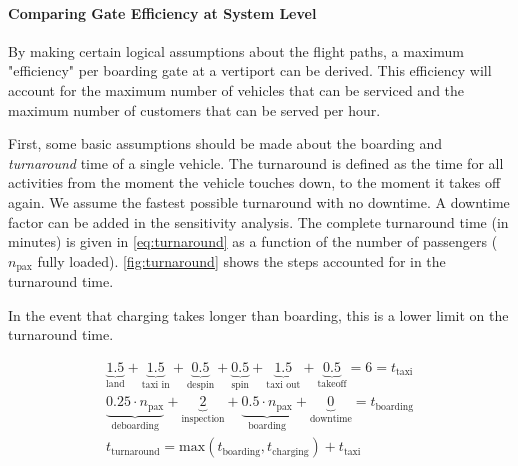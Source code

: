 \paragraph{Comparing Gate Efficiency at System Level}
By making certain logical assumptions about the flight paths, a maximum "efficiency" per boarding gate at a vertiport can be derived. This efficiency will account for the maximum number of vehicles that can be serviced and the maximum number of customers that can be served per hour.

First, some basic assumptions should be made about the boarding and \textit{turnaround} time of a single vehicle. The turnaround is defined as the time for all activities  from the moment the vehicle touches down, to the moment it takes off again. We assume the fastest possible turnaround with no downtime. A downtime factor can be added in the sensitivity analysis. The complete turnaround time (in minutes) is given in \autoref{eq:turnaround} as a function of the number of passengers ($n_\text{pax}$ fully loaded). \autoref{fig:turnaround} shows the steps accounted for in the turnaround time.

In the event that charging takes longer than boarding, this is a lower limit on the turnaround time.

\begin{equation}\label{eq:turnaround}
\begin{split}
    \underbrace{1.5}_\text{land}+\underbrace{1.5}_\text{taxi in}+\underbrace{0.5}_\text{despin}+\underbrace{0.5}_\text{spin}+\underbrace{1.5}_\text{taxi out}+\underbrace{0.5}_\text{takeoff} = 6 = t_\text{taxi} \\
    \underbrace{0.25\cdot n_\text{pax}}_\text{deboarding}+\underbrace{2}_\text{inspection}+\underbrace{0.5\cdot n_\text{pax}}_\text{boarding}+\underbrace{0}_\text{downtime}  = t_\text{boarding} \\
    t_\text{turnaround} = \text{max}\left( t_\text{boarding}, t_\text{charging}\right) + t_\text{taxi}
\end{split}
\end{equation}

